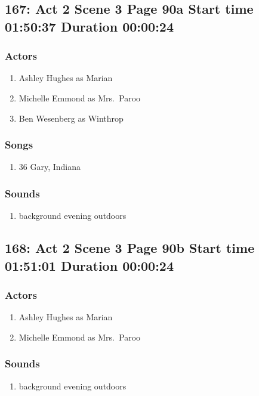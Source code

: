 \subsection{167: Act 2 Scene 3 Page 90a Start time 01:50:37 Duration 00:00:24}

\subsubsection{Actors}
\begin{enumerate}
\item Ashley Hughes as Marian
\item Michelle Emmond as Mrs.~Paroo
\item Ben Wesenberg as Winthrop
\end{enumerate}

\subsubsection{Songs}
\begin{enumerate}
\item 36 Gary, Indiana
\end{enumerate}\subsubsection{Sounds}
\begin{enumerate}
\item background evening outdoors
\end{enumerate}
\subsection{168: Act 2 Scene 3 Page 90b Start time 01:51:01 Duration 00:00:24}

\subsubsection{Actors}
\begin{enumerate}
\item Ashley Hughes as Marian
\item Michelle Emmond as Mrs.~Paroo
\end{enumerate}

\subsubsection{Sounds}
\begin{enumerate}
\item background evening outdoors
\end{enumerate}
